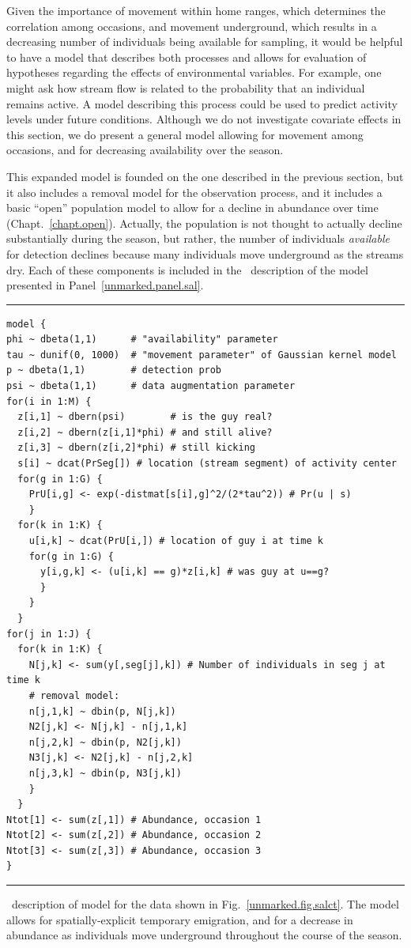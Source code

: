 Given the importance of movement within home ranges, which determines
the correlation among occasions, and movement underground, which
results in a decreasing number of individuals being available for
sampling, it would be helpful to have a model that describes both
processes and allows for evaluation of hypotheses regarding the
effects of environmental variables. For example, one might ask how
stream flow is related to the probability that an individual remains
active.
A model describing this process could be used to predict
activity levels under future conditions. Although we do not
investigate covariate effects in this section, we do present a general
model allowing for movement among occasions, and for decreasing
availability over the season.

This expanded model is founded on the one described in the previous
section, but it also includes a removal model for the observation
process, and it includes a basic ``open'' population model to allow
for a decline in abundance over time
(Chapt.~\ref{chapt.open}). Actually, the population is not thought to
actually decline substantially during the season, but rather, the
number of individuals \textit{available} for detection declines
because many individuals move underground as the streams dry. Each of
these components is included in the \bugs~description of the
model presented in Panel~\ref{unmarked.panel.sal}.


\begin{panel}[ht]
\centering
\rule[0.05in]{\textwidth}{.03in}
\begin{small}
\begin{verbatim}
model {
phi ~ dbeta(1,1)      # "availability" parameter
tau ~ dunif(0, 1000)  # "movement parameter" of Gaussian kernel model
p ~ dbeta(1,1)        # detection prob
psi ~ dbeta(1,1)      # data augmentation parameter
for(i in 1:M) {
  z[i,1] ~ dbern(psi)        # is the guy real?
  z[i,2] ~ dbern(z[i,1]*phi) # and still alive?
  z[i,3] ~ dbern(z[i,2]*phi) # still kicking
  s[i] ~ dcat(PrSeg[]) # location (stream segment) of activity center
  for(g in 1:G) {
    PrU[i,g] <- exp(-distmat[s[i],g]^2/(2*tau^2)) # Pr(u | s)
    }
  for(k in 1:K) {
    u[i,k] ~ dcat(PrU[i,]) # location of guy i at time k
    for(g in 1:G) {
      y[i,g,k] <- (u[i,k] == g)*z[i,k] # was guy at u==g?
      }
    }
  }
for(j in 1:J) {
  for(k in 1:K) {
    N[j,k] <- sum(y[,seg[j],k]) # Number of individuals in seg j at time k
    # removal model:
    n[j,1,k] ~ dbin(p, N[j,k])
    N2[j,k] <- N[j,k] - n[j,1,k]
    n[j,2,k] ~ dbin(p, N2[j,k])
    N3[j,k] <- N2[j,k] - n[j,2,k]
    n[j,3,k] ~ dbin(p, N3[j,k])
    }
  }
Ntot[1] <- sum(z[,1]) # Abundance, occasion 1
Ntot[2] <- sum(z[,2]) # Abundance, occasion 2
Ntot[3] <- sum(z[,3]) # Abundance, occasion 3
}
\end{verbatim}
\end{small}
\rule[0.05in]{\textwidth}{.03in}
\caption{\bugs~description of model for the data shown in
  Fig.~\ref{unmarked.fig.salct}. The model allows for
  spatially-explicit temporary emigration, and for a decrease in
  abundance as individuals move underground throughout the course of
  the season.}
\label{unmarked.panel.sal}
\end{panel}

